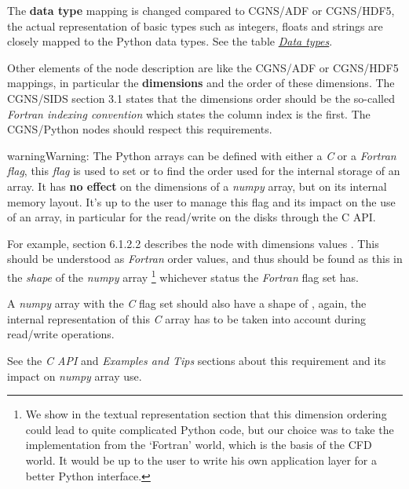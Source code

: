 \documentclass[a4paper,10pt,english]{sphinxmanual}
\begin{document}
The \textbf{data type} mapping is changed compared to CGNS/ADF or CGNS/HDF5, the
actual representation of basic types such as integers, floats and strings
are closely mapped to the Python data types.
See the table {\hyperref[sids-to-python:table-data-types]{\emph{Data types}}}.

Other elements of the node description are like the CGNS/ADF or CGNS/HDF5
mappings, in particular the \textbf{dimensions} and the order of these dimensions.
The CGNS/SIDS section 3.1 states that the dimensions order should be the
so-called \emph{Fortran indexing convention} which states the column index is
the first. The CGNS/Python nodes should respect this requirements.

\begin{notice}{warning}{Warning:}
The Python arrays can be defined with either a \emph{C} or a \emph{Fortran} \emph{flag},
this \emph{flag} is used to set or to find the order used for the internal
storage of an array. It has \textbf{no effect} on the dimensions of a \emph{numpy}
array, but on its internal memory layout.
It's up to the user to manage this flag and its impact on the use of an
array, in particular for the read/write on the disks through the C API.
\end{notice}

For example, section 6.1.2.2  describes the  node
with dimensions values .
This should be understood as \emph{Fortran} order values, and thus 
should be found as this in the \emph{shape} of the \emph{numpy} array \footnote{
We show in the textual representation section that this dimension
ordering could lead to quite complicated Python code, but our choice
was to take the implementation from the `Fortran' world,
which is the basis of the CFD world. It would be up to the user to
write his own application layer for a better Python interface.
}
whichever status the \emph{Fortran} flag set has.

A \emph{numpy} array with the \emph{C} flag set should also have a shape of
, again, the internal representation of this \emph{C} array has to
be taken into account during read/write operations.

See the \emph{C API} and \emph{Examples and Tips} sections about this requirement and
its impact on \emph{numpy} array use.
\end{document}
